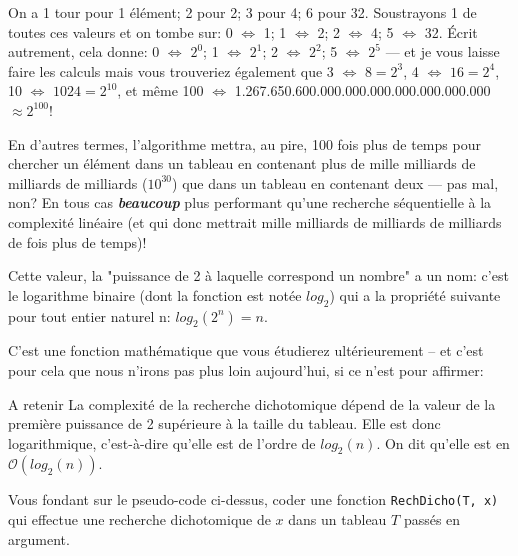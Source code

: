\documentclass[12pt]{article}
\begin{document}
\begin{MaReponse}
\begin{alphenum}
			\vspace{\baselineskip}
			\item On a 1 tour pour 1 élément; 2 pour 2; 3 pour 4; 6 pour 32. Soustrayons 1 de toutes ces valeurs et on tombe sur: 0 $\Leftrightarrow$ 1; 1 $\Leftrightarrow$ 2; 2 $\Leftrightarrow$ 4; 5 $\Leftrightarrow$ 32. Écrit autrement, cela donne: 0 $\Leftrightarrow$ $2^{0}$; 1 $\Leftrightarrow$ $2^{1}$; 2 $\Leftrightarrow$ $2^{2}$; 5 $\Leftrightarrow$ $2^{5}$ --- et je vous laisse faire les calculs mais vous trouveriez également que 3 $\Leftrightarrow$ $8 = 2^{3}$, 4 $\Leftrightarrow$ $16 = 2^{4}$, 10 $\Leftrightarrow$ $1024 = 2^{10}$,  et même 100 $\Leftrightarrow$ 1.267.650.600.000.000.000.000.000.000.000 $\approx 2^{100}$!
			
			En d'autres termes, l'algorithme mettra, au pire, 100 fois plus de temps pour chercher un élément dans un tableau en contenant plus de mille milliards de milliards de milliards ($10^{30}$) que dans un tableau en contenant deux --- pas mal, non? En tous cas \textbf{\textit{beaucoup}} plus performant qu'une recherche séquentielle à la complexité linéaire (et qui donc mettrait mille milliards de milliards de milliards de fois plus de temps)!
		\end{alphenum}
	\end{MaReponse}
	
	Cette valeur, la "puissance de 2 à laquelle correspond un nombre" a un nom: c'est le logarithme binaire (dont la fonction est notée $log_2$) qui a la propriété suivante pour tout entier naturel n: $log_2(2^n) = n$.
	
	C'est une fonction mathématique que vous étudierez ultérieurement -- et c'est pour cela que nous n'irons pas plus loin aujourd'hui, si ce n'est pour affirmer:
	
	\begin{MonAmp}{A retenir}
		La complexité de la recherche dichotomique dépend de la valeur de la première puissance de 2 supérieure à la taille du tableau. Elle est donc logarithmique, c'est-à-dire qu'elle est de l'ordre de $log_2(n)$. On dit qu’elle est en  $\mathcal{O}(log_2(n))$.
	\end{MonAmp}
	
	\begin{MonExo}
		Vous fondant sur le pseudo-code ci-dessus, coder une fonction \texttt{RechDicho(T, x)} qui effectue une recherche dichotomique de $x$ dans un tableau $T$ passés en argument.
	\end{MonExo}
	\begin{MaReponse}
	\end{MaReponse}
	
\end{document}
